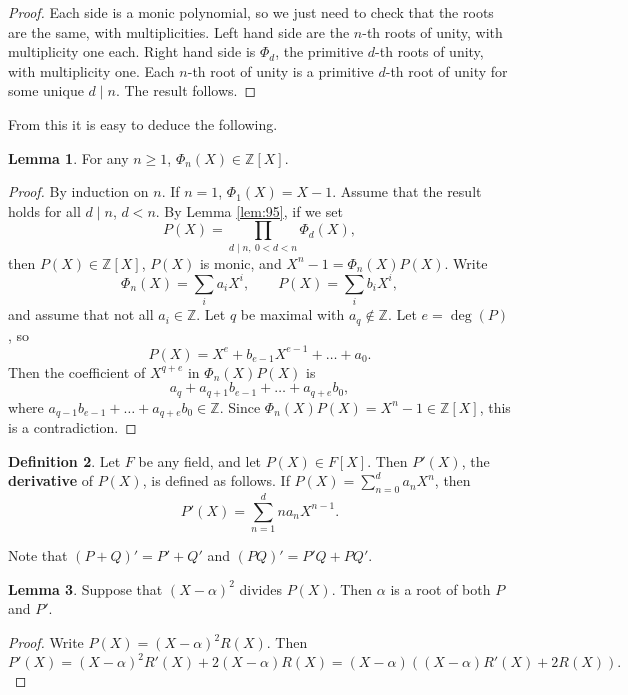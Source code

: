 \documentclass{article}
\newcommand{\Z}{\mathbb{Z}}
\newcommand{\rb}[1]{\left( #1 \right)}
\renewcommand{\sb}[1]{\left[ #1 \right]}
\theoremstyle{definition}\newtheorem{definition}{Definition}
\theoremstyle{definition}\newtheorem{remark}[definition]{Remark}
\theoremstyle{definition}\newtheorem*{example}{Example}
\theoremstyle{definition}\newtheorem*{note}{Note}
\newtheorem{lemma}[definition]{Lemma}
\begin{document}
\begin{proof}
Each side is a monic polynomial, so we just need to check that the roots are the same, with multiplicities. Left hand side are the $ n $-th roots of unity, with multiplicity one each. Right hand side is $ \Phi_d $, the primitive $ d $-th roots of unity, with multiplicity one. Each $ n $-th root of unity is a primitive $ d $-th root of unity for some unique $ d \mid n $. The result follows.
\end{proof}

From this it is easy to deduce the following.

\begin{lemma}
For any $ n \ge 1 $, $ \Phi_n\rb{X} \in \Z\sb{X} $.
\end{lemma}

\begin{proof}
By induction on $ n $. If $ n = 1 $, $ \Phi_1\rb{X} = X - 1 $. Assume that the result holds for all $ d \mid n $, $ d < n $. By Lemma \ref{lem:95}, if we set
$$ P\rb{X} = \prod_{d \mid n, \ 0 < d < n} \Phi_d\rb{X}, $$
then $ P\rb{X} \in \Z\sb{X} $, $ P\rb{X} $ is monic, and $ X^n - 1 = \Phi_n\rb{X}P\rb{X} $. Write
$$ \Phi_n\rb{X} = \sum_i a_iX^i, \qquad P\rb{X} = \sum_i b_iX^i, $$
and assume that not all $ a_i \in \Z $. Let $ q $ be maximal with $ a_q \notin \Z $. Let $ e = \deg\rb{P} $, so
$$ P\rb{X} = X^e + b_{e - 1}X^{e - 1} + \dots + a_0. $$
Then the coefficient of $ X^{q + e} $ in $ \Phi_n\rb{X}P\rb{X} $ is
$$ a_q + a_{q + 1}b_{e - 1} + \dots + a_{q + e}b_0, $$
where $ a_{q - 1}b_{e - 1} + \dots + a_{q + e}b_0 \in \Z $. Since $ \Phi_n\rb{X}P\rb{X} = X^n - 1 \in \Z\sb{X} $, this is a contradiction.
\end{proof}

\begin{definition}
Let $ F $ be any field, and let $ P\rb{X} \in F\sb{X} $. Then $ P'\rb{X} $, the \textbf{derivative} of $ P\rb{X} $, is defined as follows. If $ P\rb{X} = \sum_{n = 0}^d a_nX^n $, then
$$ P'\rb{X} = \sum_{n = 1}^d na_nX^{n - 1}. $$
\end{definition}

Note that $ \rb{P + Q}' = P' + Q' $ and $ \rb{PQ}' = P'Q + PQ' $.

\begin{lemma}
\label{lem:98}
Suppose that $ \rb{X - \alpha}^2 $ divides $ P\rb{X} $. Then $ \alpha $ is a root of both $ P $ and $ P' $.
\end{lemma}

\begin{proof}
Write $ P\rb{X} = \rb{X - \alpha}^2R\rb{X} $. Then
$$ P'\rb{X} = \rb{X - \alpha}^2R'\rb{X} + 2\rb{X - \alpha}R\rb{X} = \rb{X - \alpha}\rb{\rb{X - \alpha}R'\rb{X} + 2R\rb{X}}. $$
\end{proof}
\end{document}
